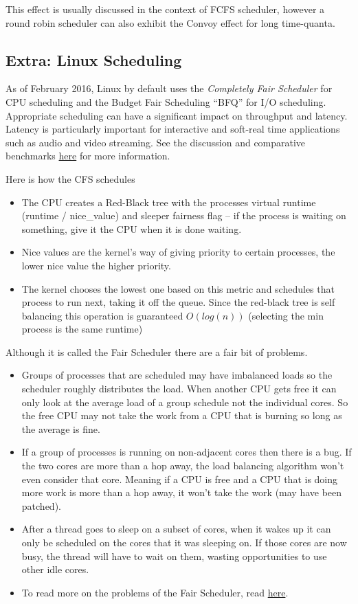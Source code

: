 This effect is usually discussed in the context of FCFS scheduler, however a round robin scheduler can also exhibit the Convoy effect for long time-quanta.

\subsection{Extra: Linux Scheduling}

As of February 2016, Linux by default uses the \emph{Completely Fair Scheduler} for CPU scheduling and the Budget Fair Scheduling ``BFQ'' for I/O scheduling. Appropriate scheduling can have a significant impact on throughput and latency. Latency is particularly important for interactive and soft-real time applications such as audio and video streaming. See the discussion and comparative benchmarks \href{https://lkml.org/lkml/2014/5/27/314}{here} for more information.

Here is how the CFS schedules

\begin{itemize}
\tightlist
\item
  The CPU creates a Red-Black tree with the processes virtual runtime (runtime / nice\_value) and sleeper fairness flag -- if the process is waiting on something, give it the CPU when it is done waiting.
\item
  Nice values are the kernel's way of giving priority to certain processes, the lower nice value the higher priority.
\item
  The kernel chooses the lowest one based on this metric and schedules that process to run next, taking it off the queue. Since the red-black tree is self balancing this operation is guaranteed \(O(log(n))\) (selecting the min process is the same runtime)
\end{itemize}

Although it is called the Fair Scheduler there are a fair bit of problems.

\begin{itemize}
\tightlist
\item
  Groups of processes that are scheduled may have imbalanced loads so the scheduler roughly distributes the load. When another CPU gets free it can only look at the average load of a group schedule not the individual cores. So the free CPU may not take the work from a CPU that is burning so long as the average is fine.
\item
  If a group of processes is running on non-adjacent cores then there is a bug. If the two cores are more than a hop away, the load balancing algorithm won't even consider that core. Meaning if a CPU is free and a CPU that is doing more work is more than a hop away, it won't take the work (may have been patched).
\item
  After a thread goes to sleep on a subset of cores, when it wakes up it can only be scheduled on the cores that it was sleeping on. If those cores are now busy, the thread will have to wait on them, wasting opportunities to use other idle cores.
\item
  To read more on the problems of the Fair Scheduler, read \href{https://blog.acolyer.org/2016/04/26/the-linux-scheduler-a-decade-of-wasted-cores}{here}.
\end{itemize}

